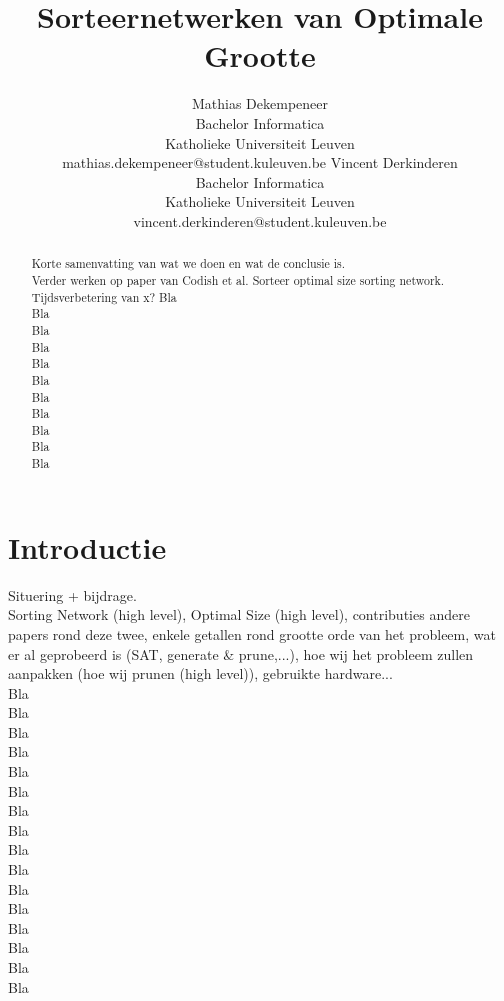 \documentclass{article}
\title{Sorteernetwerken van Optimale Grootte}%
\author{Mathias Dekempeneer\\
Bachelor Informatica\\
Katholieke Universiteit Leuven \\
mathias.dekempeneer@student.kuleuven.be
\And
Vincent Derkinderen\\
Bachelor Informatica\\
Katholieke Universiteit Leuven \\
vincent.derkinderen@student.kuleuven.be}
\begin{document}
\maketitle

\begin{abstract}
Korte samenvatting van wat we doen en wat de conclusie is.\\
Verder werken op paper van Codish et al. Sorteer optimal size sorting network.\\
Tijdsverbetering van x?
Bla\\
Bla\\
Bla\\
Bla\\
Bla\\
Bla\\
Bla\\
Bla\\
Bla\\
Bla\\
Bla\\
\end{abstract}

\section{Introductie}

Situering + bijdrage.\\
Sorting Network (high level), Optimal Size (high level), contributies andere papers rond deze twee, enkele getallen rond grootte orde van het probleem, wat er al geprobeerd is (SAT, generate \& prune,...), hoe wij het probleem zullen aanpakken (hoe wij prunen (high level)), gebruikte hardware...\\
Bla\\
Bla\\
Bla\\
Bla\\
Bla\\
Bla\\
Bla\\
Bla\\
Bla\\
Bla\\
Bla\\
Bla\\
Bla\\
Bla\\
Bla\\
Bla\\
\end{document}
